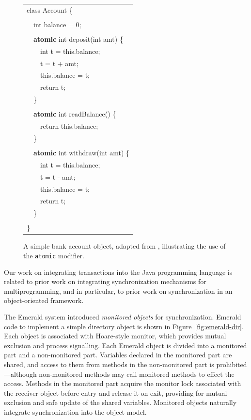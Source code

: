 \documentclass[12pt]{article}
\newcommand{\atomic}{\texttt{atomic}\xspace}
\newcommand{\sis}{\linespread{1.0}\setlength{\baselineskip}{0.8\baselineskip}}
\begin{document}
\begin{figure}
{\ttfamily\small\vspace{.25in}
\sis%
\begin{tabular}{l}
class Account \{\\
\\
~~int balance = 0;\\
\\
~~{\bf atomic} int deposit(int amt) \{\\
~~~~int t = this.balance;\\
~~~~t = t + amt;\\
~~~~this.balance = t;\\
~~~~return t;\\
~~\}\\
\\
~~{\bf atomic} int readBalance() \{\\
~~~~return this.balance;\\
~~\}\\
\\
~~{\bf atomic} int withdraw(int amt) \{\\
~~~~int t = this.balance;\\
~~~~t = t - amt;\\
~~~~this.balance = t;\\
~~~~return t;\\
~~\}\\
\\
\}\\
\end{tabular}
}\vspace{.2in}
\caption{A simple bank account object, adapted from \cite{FlanaganQa03},
  illustrating the use of the \atomic modifier.}
\label{fig:atomic}
\end{figure}

Our work on integrating transactions into the Java programming
language is related to prior work on integrating synchronization
mechanisms for multiprogramming, and in particular, to prior work on
synchronization in an object-oriented framework.

The Emerald system \cite{BlackHuJuLe86,JulSt91} introduced
\emph{monitored objects} for synchronization.  Emerald code to
implement a simple directory object is shown in
Figure~\ref{fig:emerald-dir}.  Each object is associated with
Hoare-style monitor, which provides mutual exclusion and process
signalling.  Each Emerald object is divided into a monitored part and
a non-monitored part.  Variables declared in the monitored part are
shared, and access to them from methods in the non-monitored part is
prohibited---although non-monitored methods may call monitored methods
to effect the access.  Methods in the monitored part acquire the monitor lock
associated with the receiver object before entry and release it on
exit, providing for mutual exclusion and safe update of the shared
variables.  Monitored objects naturally integrate synchronization into
the object model.
\end{document}
